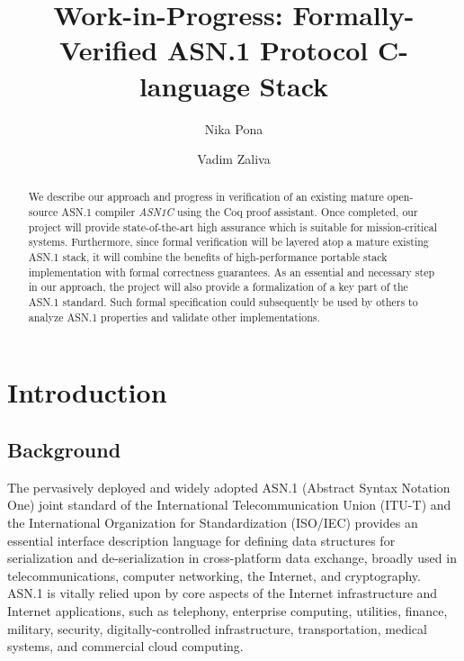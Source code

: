 \documentclass[acmsmall,nonacm]{acmart}
\begin{document}
\title{Work-in-Progress: Formally-Verified ASN.1 Protocol C-language Stack}

\author{Nika Pona}
\author{Vadim Zaliva}

\begin{abstract}

  We describe our approach and progress in verification of an existing
  mature open-source ASN.1 compiler \emph{ASN1C} using the Coq proof
  assistant. Once completed, our project will provide state-of-the-art
  high assurance which is suitable for mission-critical
  systems. Furthermore, since formal verification will be layered atop
  a mature existing ASN.1 stack, it will combine the benefits of
  high-performance portable stack implementation with formal
  correctness guarantees. As an essential and necessary step in our
  approach, the project will also provide a formalization of a key
  part of the ASN.1 standard. Such formal specification could
  subsequently be used by others to analyze ASN.1 properties and
  validate other implementations.

\end{abstract}

\maketitle


\section{Introduction}

\subsection{Background}

The pervasively deployed and widely adopted ASN.1 (Abstract Syntax
Notation One) \cite{ASN1Intro} joint standard of the International
Telecommunication Union (ITU-T) and the International Organization for
Standardization (ISO/IEC) provides an essential interface description
language for defining data structures for serialization and
de-serialization in cross-platform data exchange, broadly used in
telecommunications, computer networking, the Internet, and
cryptography. ASN.1 is vitally relied upon by core aspects of the
Internet infrastructure and Internet applications, such as telephony,
enterprise computing, utilities, finance, military, security,
digitally-controlled infrastructure, transportation, medical systems,
and commercial cloud computing.
\end{document}
